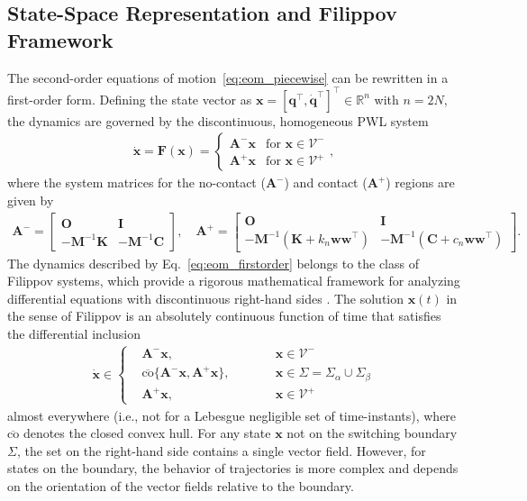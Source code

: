 \documentclass[a4paper,9pt,parskip=half,english]{article}
\theoremstyle{plain}
\theoremstyle{definition}
\newcommand{\T}{^{\!\top}} %
\newcommand{\mR}{\mathbb{R}}
\newcommand{\vq}{\mathbf q}
\newcommand{\vw}{\mathbf w}
\newcommand{\vx}{\mathbf x}
\newcommand{\vA}{\mathbf A}
\newcommand{\vC}{\mathbf C}
\newcommand{\vF}{\mathbf F}
\newcommand{\vI}{\mathbf I}
\newcommand{\vK}{\mathbf K}
\newcommand{\vM}{\mathbf M}
\newcommand{\vO}{\mathbf O}
\newcommand{\cVplus}{\mathcal{V}^+}
\newcommand{\cVminus}{\mathcal{V}^-}
\begin{document}
\subsection{State-Space Representation and Filippov Framework}
The second-order equations of motion~\eqref{eq:eom_piecewise} can be rewritten in a first-order form. Defining the state vector as $\vx = [\vq\T, \dot{\vq}\T]\T \in \mR^n$ with $n=2N$, the dynamics are governed by the discontinuous, homogeneous PWL system
\begin{align}\label{eq:eom_firstorder}
	\dot{\vx} = \vF(\vx) = \begin{cases} \vA^- \vx & \text{for } \vx \in \cVminus \\ \vA^+ \vx & \text{for } \vx \in \cVplus \end{cases},
\end{align}
where the system matrices for the no-contact ($\vA^-$) and contact ($\vA^+$) regions are given by
\begin{align}\label{eq:sys_matrices}
	\vA^- = \begin{bmatrix} \vO & \vI \\ -\vM^{-1}\vK & -\vM^{-1}\vC \end{bmatrix}, \quad \vA^+ = \begin{bmatrix} \vO & \vI \\ -\vM^{-1}(\vK + k_n\vw\vw\T) & -\vM^{-1}(\vC + c_n\vw\vw\T) \end{bmatrix}.
\end{align}
The dynamics described by Eq.~\eqref{eq:eom_firstorder} belongs to the class of Filippov systems, which provide a rigorous mathematical framework for analyzing differential equations with discontinuous right-hand sides \cite{Filippov1988}. The solution $\vx(t)$ in the sense of Filippov is an absolutely continuous function of time that satisfies the differential inclusion
\begin{align}
	\dot{\vx} \in \left\{ 
	\begin{alignedat}{2} %
		& \vA^- \vx , && \qquad \vx \in \cVminus \\ 
		& \overline{\text{co}}\{\vA^-\vx, \vA^+\vx\}, && \qquad \vx \in \Sigma = \Sigma_\alpha \cup \Sigma_\beta \\ 
		& \vA^+ \vx , && \qquad \vx \in \cVplus
	\end{alignedat}
	\right.
\end{align}
almost everywhere (i.e., not for a Lebesgue negligible set of time-instants), where $\overline{\text{co}}$ denotes the closed convex hull. For any state $\vx$ not on the switching boundary $\Sigma$, the set on the right-hand side contains a single vector field. However, for states on the boundary, the behavior of trajectories is more complex and depends on the orientation of the vector fields relative to the boundary.
\end{document}
